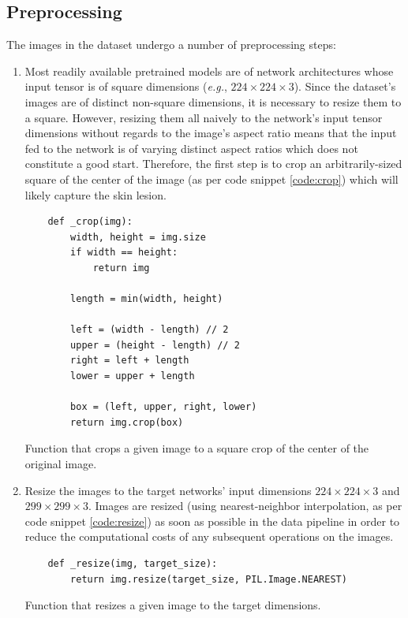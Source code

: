 \subsection{Preprocessing}
\label{subsection:preprocessing}

The images in the dataset undergo a number of preprocessing steps:

\begin{enumerate}
    \item Most readily available pretrained models are of network architectures whose input tensor is of square dimensions (\textit{e.g.}, $224 \times 224 \times 3$). Since the dataset's images are of distinct non-square dimensions, it is necessary to resize them to a square. However, resizing them all naively to the network's input tensor dimensions without regards to the image's aspect ratio means that the input fed to the network is of varying distinct aspect ratios which does not constitute a good start. Therefore, the first step is to crop an arbitrarily-sized square of the center of the image (as per code snippet \ref{code:crop}) which will likely capture the skin lesion.

    \begin{listing}[ht]
    \begin{verbatim}
    def _crop(img):
        width, height = img.size
        if width == height:
            return img

        length = min(width, height)

        left = (width - length) // 2
        upper = (height - length) // 2
        right = left + length
        lower = upper + length

        box = (left, upper, right, lower)
        return img.crop(box)
    \end{verbatim}
    \caption{Function that crops a given image to a square crop of the center of the original image.}
    \label{code:crop}
    \end{listing}

\item Resize the images to the target networks' input dimensions $224 \times 224 \times 3$ and $299 \times 299 \times 3$. Images are resized (using nearest-neighbor interpolation, as per code snippet \ref{code:resize}) as soon as possible in the data pipeline in order to reduce the computational costs of any subsequent operations on the images.

    \begin{listing}[ht]
    \begin{verbatim}
    def _resize(img, target_size):
        return img.resize(target_size, PIL.Image.NEAREST)
    \end{verbatim}
    \caption{Function that resizes a given image to the target dimensions.}
    \label{code:resize}
    \end{listing}


\end{enumerate}
